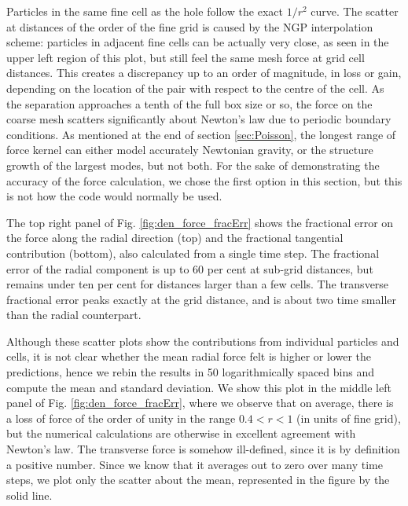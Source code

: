 \documentclass[useAMS,usenatbib]{mn2e}
\begin{document}
Particles in the same fine cell as the hole follow the exact $1/r^{2}$ curve. The scatter at 
  distances of the order of the fine grid is caused by the NGP interpolation scheme:
  particles in adjacent fine cells can be actually very close, as seen in the upper left region of this plot,
  but still feel the same mesh force at grid cell distances.
This  creates a discrepancy up to an order of magnitude, in loss or gain, depending on the location of the pair with respect to the centre of the cell.
As the separation approaches a tenth of the full box size or so, the force on the coarse mesh 
scatters significantly about Newton's law due to periodic boundary conditions. 
As mentioned at the end of section \ref{sec:Poisson}, the longest range of force kernel can either model accurately Newtonian gravity,
or the structure growth of the largest modes, but not both. For the sake of demonstrating the accuracy of the force calculation,
we chose the first option in this section, but this is not how the code would normally be used.

The top right panel of Fig. \ref{fig:den_force_fracErr} shows the fractional error on the force along the radial direction (top) and the fractional 
tangential contribution (bottom), also calculated from a single time step.
The fractional error of the radial component is up to 60 per cent at sub-grid distances, but remains under ten per cent for  distances larger than a few cells. 
The transverse fractional error peaks exactly at the grid distance,  and is about two time smaller than the radial counterpart.

Although these scatter plots show the contributions from individual particles and cells, it is not clear
whether the mean radial force felt is higher or lower the predictions, hence we rebin the results
in 50 logarithmically spaced bins and compute the mean and standard deviation. 
We show this plot in the middle left panel of Fig. \ref{fig:den_force_fracErr}, where we observe that on average,
there is a loss of force of the order of unity in the range $ 0.4 < r < 1$ (in units of fine grid), but the numerical calculations are otherwise
in excellent agreement with Newton's law.
The transverse force is somehow ill-defined, since it is by definition a positive number.
Since we know that it averages out to zero over many time steps, we plot only the scatter about the mean, represented in the figure by the solid line.
\end{document}

